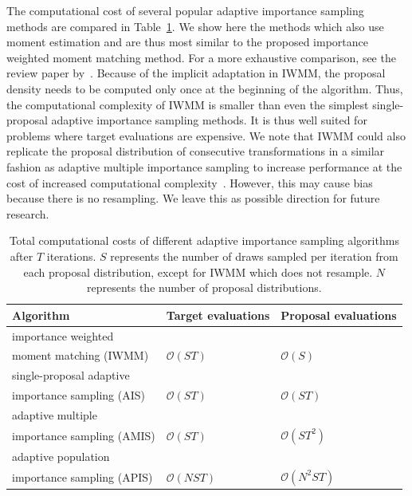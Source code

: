 \documentclass[12pt]{article}
\begin{document}
The computational cost of several popular adaptive importance sampling methods are compared in
Table~\ref{tab:complexity}.
We show here the methods which also use moment estimation and are thus most similar to the proposed importance
weighted moment matching method. For a more exhaustive comparison, see
the review paper by~\citet{bugallo2017adaptive}.
Because of the implicit adaptation in IWMM, the proposal density needs
to be computed only once at the beginning of the algorithm. Thus, the
computational complexity of IWMM is smaller than even the simplest single-proposal adaptive importance sampling
methods.
It is thus well suited for problems where target evaluations are expensive.
We note that IWMM could also replicate the proposal distribution of consecutive transformations
in a similar fashion as adaptive multiple importance sampling
to increase performance at the cost of increased computational complexity~\citep{cornuet2012adaptive}.
However, this may cause bias because there is no resampling. We leave this as possible
direction for future research.









\begin{table}[tb]
\centering
\caption{Total computational costs of different adaptive importance sampling algorithms after $T$ iterations. $S$ represents the number of draws sampled per iteration from each proposal distribution, except for IWMM which does not resample. $N$ represents the number of proposal distributions.}
\label{tab:complexity}
\begin{tabular}{ l l l }
\toprule
Algorithm & Target evaluations & Proposal evaluations  \\
\midrule
importance weighted \\ moment matching (IWMM)                         & $\mathcal{O}(ST)$  & $\mathcal{O}(S)$ \\
\hline
%
%
single-proposal adaptive \\ importance sampling (AIS)                        & $\mathcal{O}(ST)$  & $\mathcal{O}(ST)$  \\
\hline
adaptive multiple \\ importance sampling (AMIS)                         & $\mathcal{O}(ST)$  & $\mathcal{O}(ST^2)$   \\
\hline
adaptive population \\ importance sampling (APIS)                         & $\mathcal{O}(NST)$  & $\mathcal{O}(N^2 S T)$    \\



\bottomrule
\end{tabular}
\end{table}
\end{document}
